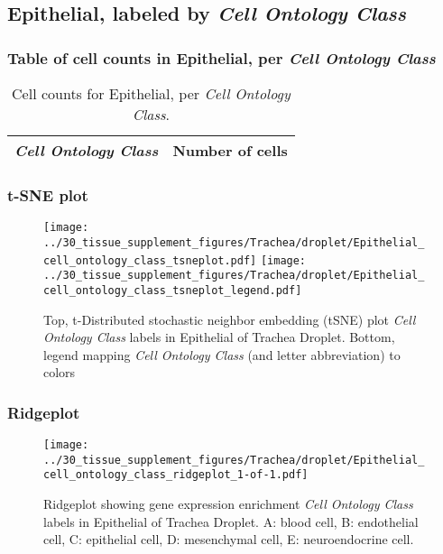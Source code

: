 \clearpage

\subsection{Epithelial, labeled by \emph{Cell Ontology Class}}
\subsubsection{Table of cell counts in Epithelial, per \emph{Cell Ontology Class}}\begin{table}[h]
\centering
\label{my-label}
\begin{tabular}{@{}ll@{}}
\toprule

\emph{Cell Ontology Class}& Number of cells \\ \midrule\bottomrule
\end{tabular}
\caption{Cell counts for Epithelial, per \emph{Cell Ontology Class}.}
\end{table}

\clearpage
\subsubsection{t-SNE plot}
\begin{figure}[h]
\centering
\texttt{[image: ../30\_tissue\_supplement\_figures/Trachea/droplet/Epithelial\_cell\_ontology\_class\_tsneplot.pdf]}
\texttt{[image: ../30\_tissue\_supplement\_figures/Trachea/droplet/Epithelial\_cell\_ontology\_class\_tsneplot\_legend.pdf]}
\caption{Top, t-Distributed stochastic neighbor embedding (tSNE) plot  \emph{Cell Ontology Class} labels in Epithelial of Trachea Droplet. Bottom, legend mapping \emph{Cell Ontology Class} (and letter abbreviation) to colors}
\end{figure}


\clearpage

\subsubsection{Ridgeplot}
\begin{figure}[h]
\centering
\texttt{[image: ../30\_tissue\_supplement\_figures/Trachea/droplet/Epithelial\_cell\_ontology\_class\_ridgeplot\_1-of-1.pdf]}

\caption{ Ridgeplot  showing gene expression enrichment \emph{Cell Ontology Class} labels in Epithelial of Trachea Droplet. A: blood cell, B: endothelial cell, C: epithelial cell, D: mesenchymal cell, E: neuroendocrine cell.}
\end{figure}


